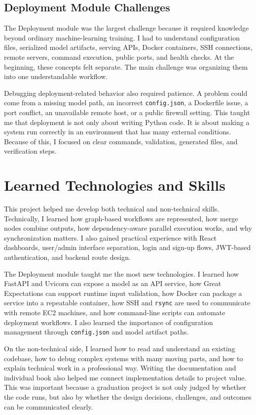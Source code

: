 \documentclass[12pt,a4paper,oneside]{report}
\begin{document}
\subsection{Deployment Module Challenges}
\noindent The Deployment module was the largest challenge because it required knowledge beyond ordinary machine-learning training. I had to understand configuration files, serialized model artifacts, serving APIs, Docker containers, SSH connections, remote servers, command execution, public ports, and health checks. At the beginning, these concepts felt separate. The main challenge was organizing them into one understandable workflow.

Debugging deployment-related behavior also required patience. A problem could come from a missing model path, an incorrect \texttt{config.json}, a Dockerfile issue, a port conflict, an unavailable remote host, or a public firewall setting. This taught me that deployment is not only about writing Python code. It is about making a system run correctly in an environment that has many external conditions. Because of this, I focused on clear commands, validation, generated files, and verification steps.

\section{Learned Technologies and Skills}
\noindent This project helped me develop both technical and non-technical skills. Technically, I learned how graph-based workflows are represented, how merge nodes combine outputs, how dependency-aware parallel execution works, and why synchronization matters. I also gained practical experience with React dashboards, user/admin interface separation, login and sign-up flows, JWT-based authentication, and backend route design.

The Deployment module taught me the most new technologies. I learned how FastAPI and Uvicorn can expose a model as an API service, how Great Expectations can support runtime input validation, how Docker can package a service into a repeatable container, how SSH and \texttt{rsync} are used to communicate with remote EC2 machines, and how command-line scripts can automate deployment workflows. I also learned the importance of configuration management through \texttt{config.json} and model artifact paths.

On the non-technical side, I learned how to read and understand an existing codebase, how to debug complex systems with many moving parts, and how to explain technical work in a professional way. Writing the documentation and individual book also helped me connect implementation details to project value. This was important because a graduation project is not only judged by whether the code runs, but also by whether the design decisions, challenges, and outcomes can be communicated clearly.
\end{document}
